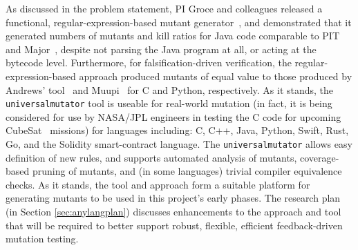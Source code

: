 As discussed in the problem statement, PI Groce and colleagues
released a functional, regular-expression-based mutant
generator~\cite{regexpMut,universalmutator}, and demonstrated that it
generated numbers of mutants and kill ratios for Java code comparable
to PIT~\cite{pittest} and Major~\cite{Major}, despite not parsing the
Java program at all, or acting at the bytecode level.  Furthermore,
for falsification-driven verification, the regular-expression-based
approach produced mutants of equal value to those produced by Andrews'
tool~\cite{mutant} and Muupi~\cite{muupi} for C and Python,
respectively.  As it stands, the {\tt universalmutator} tool is
useable for real-world mutation (in fact, it is being considered for
use by NASA/JPL engineers in testing the C code for upcoming CubeSat~\cite{CubeSat}
missions) for languages including: C, C++, Java, Python, Swift, Rust,
Go, and the Solidity smart-contract language.  The {\tt universalmutator} allows easy definition of new rules, and supports
automated analysis of mutants, coverage-based pruning of mutants, and
(in some languages) trivial compiler equivalence~\cite{TCE} checks.
As it stands, the tool and approach form a suitable platform for
generating mutants to be used in this project's early phases.  The
research plan (in Section \ref{sec:anylangplan}) discusses enhancements to the approach and tool that will be required
to better support robust, flexible, efficient feedback-driven mutation
testing.
